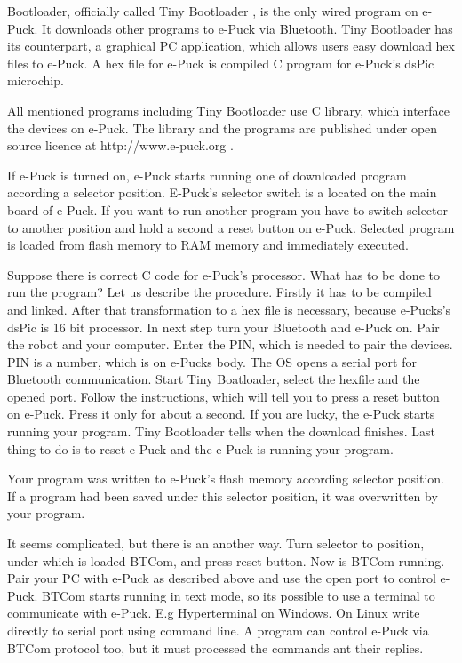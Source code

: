 	Bootloader, officially called Tiny Bootloader%
	, is the only wired program on e-Puck. It downloads	other programs to e-Puck via Bluetooth. 
	Tiny Bootloader has its counterpart, a graphical PC application,
	which allows users easy download hex files to e-Puck.
	A hex file for e-Puck is compiled C program for e-Puck's dsPic microchip. 
	 
	All mentioned programs including Tiny Bootloader use C library, which interface the devices on e-Puck. 
	The library and the programs are published under open source licence at http://www.e-puck.org .%

	 
	If e-Puck is turned on, e-Puck starts running one of downloaded program according a selector 
	position. E-Puck's selector switch is a located on the main board of e-Puck.
	If you want to run another program you have to switch selector to another position
	and hold a second a reset button on e-Puck.	Selected program is loaded from flash memory
	to RAM memory and immediately executed.	
	 
	Suppose there is correct C code for e-Puck's processor. What has to be done to run the program?
	Let us describe the procedure.
	Firstly it has to be compiled and linked. After that transformation to a hex file is necessary,
	because e-Pucks's dsPic is 16 bit processor. In next step turn your Bluetooth and e-Puck on. 
	Pair the robot and your computer. Enter the PIN, 
 	which is needed to pair the devices. 
	PIN is a number, which is on e-Pucks body.
	The OS opens a serial port for Bluetooth communication.
	Start Tiny Boatloader, select the hexfile and the opened port. Follow the instructions,
	which will tell you to press a reset button on e-Puck. Press it only for about a second.
	If you are lucky, the e-Puck starts running your program.
	Tiny Bootloader tells when the download finishes. Last thing to do is to reset e-Puck
	and the e-Puck is running your program.
	 
	Your program was written to e-Puck's flash memory according selector position.
	If a program had been saved under this selector position, it was overwritten by your program.
	 
	It seems complicated, but there is an another way. 
	Turn selector to position, under which is loaded BTCom, and press reset button.
	Now is BTCom running.  Pair your PC with e-Puck as described above and use the open port
	to control e-Puck.
	BTCom starts running in text mode, so its possible to use a terminal to communicate with e-Puck.
	E.g Hyperterminal on Windows. On Linux write directly to serial port using command line.
	A program can control e-Puck via BTCom protocol too, but it must processed the commands ant their replies.
	 

